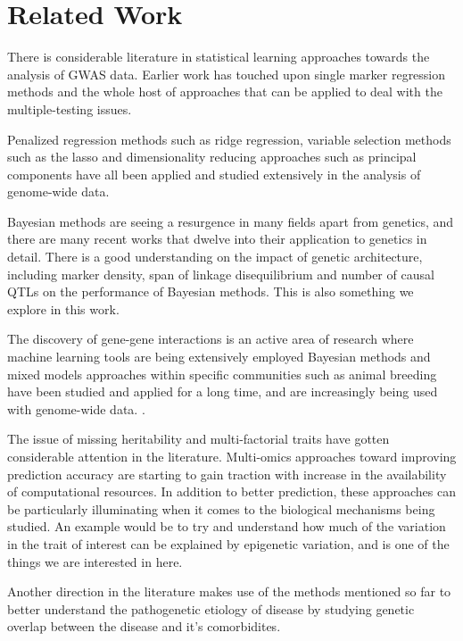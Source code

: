 \documentclass{sig-alternate-05-2015}
\begin{document}
\section{Related Work}

There is considerable literature in statistical learning approaches towards the analysis of GWAS data. Earlier work has
touched upon single marker regression methods and the whole host of approaches that can be applied to
deal with the multiple-testing issues.

Penalized regression methods such as ridge regression,\cite{austin_penalized_2013}
variable selection methods such as the lasso  and dimensionality reducing approaches such as principal components \cite{price_principal_2006} have all been applied and studied extensively in the analysis of
genome-wide data.

Bayesian methods are seeing a resurgence in many fields apart from genetics, and there are many recent works that dwelve into their application
to genetics in detail. There is a good understanding on the impact of genetic architecture, including marker density, span of linkage disequilibrium
and number of causal QTLs on the performance of Bayesian methods. This is also something we explore in this work.

The discovery of gene-gene interactions is an active area of research where machine learning tools are being extensively employed \cite{upstill-goddard_machine_2013}
Bayesian methods and mixed models approaches within specific communities such as animal breeding have been
studied and applied for a long time, and are increasingly being used with genome-wide data. \cite{de_los_campos_whole-genome_2013}.

The issue of missing heritability and multi-factorial traits have gotten considerable attention in the literature. Multi-omics approaches toward improving prediction accuracy
are starting to gain traction with increase in the availability of computational resources. In addition to better prediction, these approaches can be particularly illuminating when
it comes to the biological mechanisms being studied. \cite{kim_multi-omics_2016}
An example would be to try and understand how much of the variation in the trait of interest can be explained by epigenetic variation, and is one of the things we are interested in here.

Another direction in the literature makes use of the methods mentioned so far to better understand the pathogenetic etiology of disease by studying genetic overlap between the disease and it's comorbidites.
\end{document}
